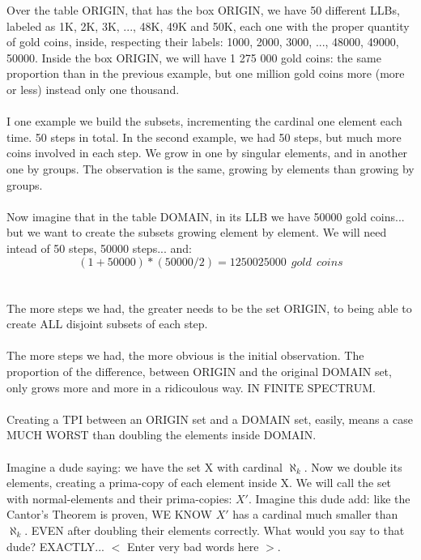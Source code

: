 		\noindent
		Over the table ORIGIN, that has the box ORIGIN, we have 50 different LLBs, labeled as 1K, 2K, 3K, ..., 48K, 49K and 50K, each one with the proper quantity of gold coins, inside, respecting their labels: 1000, 2000, 3000, ..., 48000, 49000, 50000. Inside the box ORIGIN, we will have 1 275 000 gold coins: the same proportion than in the previous example, but one million gold coins more (more or less) instead only one thousand.
		\\\\
		
		\noindent
		I one example we build the subsets, incrementing the cardinal one element each time. 50 steps in total. In the second example, we had 50 steps, but much more coins involved in each step. We grow in one by singular elements, and in another one by groups. The observation is the same, growing by elements than growing by groups.
		\\\\
		
		\noindent
		Now imagine that in the table DOMAIN, in its LLB we have 50000 gold coins... but we want to create the subsets growing element by element. We will need intead of 50 steps, 50000 steps... and:\\
		$$ (1 + 50000)* (50000/2) = 1250025000 \:\: gold \:\: coins $$
		\\\\
		
		\noindent
		The more steps we had, the greater needs to be the set ORIGIN, to being able to create ALL disjoint subsets of each step.
		\\\\
		
		\noindent
		The more steps we had, the more obvious is the initial observation. The proportion of the difference, between ORIGIN and the original DOMAIN set, only grows more and more in a ridicoulous way. IN FINITE SPECTRUM.
		\\\\
		
		\noindent
		Creating a TPI between an ORIGIN set and a DOMAIN set, easily, means a case MUCH WORST than doubling the elements inside DOMAIN.
		\\\\
		
		\noindent
		Imagine a dude saying: we have the set X with cardinal $\aleph_{k}$. Now we double its elements, creating a prima-copy of each element inside X. We will call the set with normal-elements and their prima-copies: $X'$. Imagine this dude add: like the Cantor's Theorem is proven, WE KNOW $X'$ has a cardinal much smaller than $\aleph_{k}$. EVEN after doubling their elements correctly. What would you say to that dude? EXACTLY... $<$ Enter very bad words here $>$.
		\\\\
		
